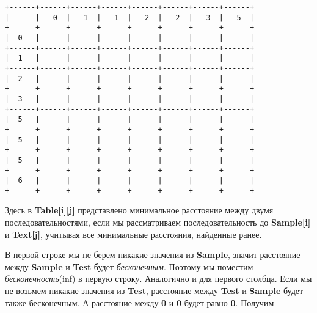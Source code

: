 \newpage
\begin{tcolorbox}
\begin{verbatim}
+------+------+------+------+------+------+------+------+
|      |   0  |   1  |   1  |   2  |   2  |   3  |   5  |
+------+------+------+------+------+------+------+------+
|  0   |      |      |      |      |      |      |      |
+------+------+------+------+------+------+------+------+
|  1   |      |      |      |      |      |      |      |
+------+------+------+------+------+------+------+------+
|  2   |      |      |      |      |      |      |      |
+------+------+------+------+------+------+------+------+
|  3   |      |      |      |      |      |      |      |
+------+------+------+------+------+------+------+------+
|  5   |      |      |      |      |      |      |      |
+------+------+------+------+------+------+------+------+
|  5   |      |      |      |      |      |      |      |
+------+------+------+------+------+------+------+------+
|  5   |      |      |      |      |      |      |      |
+------+------+------+------+------+------+------+------+
|  6   |      |      |      |      |      |      |      |
+------+------+------+------+------+------+------+------+
\end{verbatim}
\end{tcolorbox}

\vspace{\baselineskip}
Здесь в \textbf{Table[i][j]} представлено минимальное расстояние между двумя последовательностями, если мы рассматриваем последовательность до \textbf{Sample[i]} и \textbf{Text[j]}, учитывая все минимальные расстояния, найденные ранее.

\vspace{\baselineskip}
В первой строке мы не берем никакие значения из \textbf{Sample}, значит расстояние между \textbf{Sample} и \textbf{Test} будет \textit{бесконечным}. Поэтому мы поместим \textit{бесконечность}(inf) в первую строку. Аналогично и для первого столбца. Если мы не возьмем никакие значения из \textbf{Test}, расстояние между \textbf{Test} и \textbf{Sample} будет также бесконечным. А расстояние между \textbf{0} и \textbf{0} будет равно \textbf{0}. Получим

